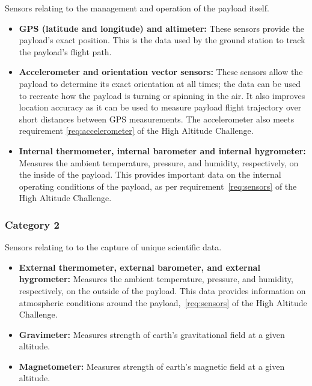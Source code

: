 \documentclass[english]{report}
\begin{document}
Sensors relating to the management and operation of the payload itself.
\begin{itemize}
\item \textbf{GPS (latitude and longitude) and altimeter: }These sensors
provide the payload's exact position. This is the data used by the
ground station to track the payload's flight path.
\item \textbf{Accelerometer and orientation vector sensors: }These sensors
allow the payload to determine its exact orientation at all times;
the data can be used to recreate how the payload is turning or spinning
in the air. It also improves location accuracy as it can be used to
measure payload flight trajectory over short distances between GPS
measurements.  The accelerometer also meets requirement \ref{req:accelerometer} of the High Altitude Challenge.
\item \textbf{Internal thermometer, internal barometer and internal hygrometer:}
Measures the ambient temperature, pressure, and humidity, respectively,
on the inside of the payload. This provides important data on the
internal operating conditions of the payload, as per requirement~\ref{req:sensors} of the High Altitude Challenge.
\end{itemize}

\subsubsection*{Category 2}

Sensors relating to to the capture of unique scientific data.
\begin{itemize}
\item \textbf{External thermometer, external barometer, and external hygrometer:
}Measures the ambient temperature, pressure, and humidity, respectively,
on the outside of the payload. This data provides information on atmospheric
conditions around the payload,~\ref{req:sensors} of the High Altitude Challenge.
\item \textbf{Gravimeter: }Measures strength of earth's gravitational field
at a given altitude.
\item \textbf{Magnetometer: }Measures strength of earth's magnetic field
at a given altitude.
\end{itemize}
\end{document}

